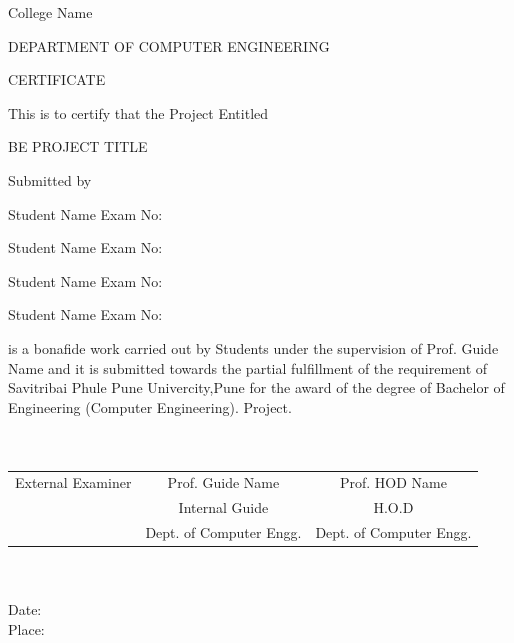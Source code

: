 \documentclass[oneside,a4paper,12pt]{report}
\begin{document}
{\bfseries \fontsize{14}{12} \selectfont \centerline{College Name}
\centerline{DEPARTMENT OF COMPUTER ENGINEERING}
\vspace*{3\baselineskip}} 


{\bfseries \fontsize{16}{12} \selectfont \centerline{CERTIFICATE} 
\vspace*{3\baselineskip}} 

\centerline{This is to certify that the Project Entitled}
\vspace*{1\baselineskip} 


{\bfseries \fontsize{14}{12} \selectfont \centerline{BE PROJECT TITLE}
\vspace*{1\baselineskip}}

\centerline{Submitted by}
\vspace*{1\baselineskip} 
\centerline{Student Name  \hspace{25 mm} Exam No: } 
\centerline{Student Name \hspace{25 mm} Exam No:  } 
\centerline{Student Name \hspace{25 mm} Exam No: }
\centerline{Student Name \hspace{25 mm} Exam No: }
\vspace*{1\baselineskip} 
is a bonafide work carried out by Students under the supervision of Prof. Guide Name and it
is submitted towards the partial fulfillment of the requirement of Savitribai Phule Pune Univercity,Pune for the award of the degree of Bachelor of Engineering (Computer Engineering). Project.\\\\\\
\bgroup
\def\arraystretch{0.7}
\begin{tabular}{c c c}
External Examiner &  \hspace{10 mm} Prof. Guide Name & \hspace{10 mm} Prof. HOD Name \\					     &  \hspace{10 mm} Internal Guide   &  \hspace{10 mm} H.O.D \\
 &  \hspace{10 mm} Dept. of Computer Engg.  &	\hspace{10 mm}Dept. of Computer Engg.  \\
\end{tabular}
\\\\
Date:\\
Place:
\end{document}
